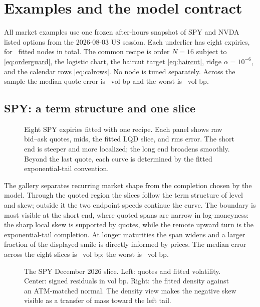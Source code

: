 \section{Examples and the model contract}
\label{sec:examples}

All market examples use one frozen after-hours snapshot of SPY and NVDA listed
options from the 2026-08-03 US session.  Each underlier has eight expiries,
for \MacSnapNodeCount\ fitted nodes in total.  The common recipe is order
$N=16$ subject to \eqref{eq:orderguard}, the logistic chart, the haircut
target \eqref{eq:haircut}, ridge $\alpha=10^{-6}$, and the calendar rows
\eqref{eq:calrows}.  No node is tuned separately.  Across the sample the
median quote error is \MacSnapMedianRmsBp\ vol bp and the worst is
\MacSnapWorstRmsBp\ vol bp.

\subsection{SPY: a term structure and one slice}

\begin{figure}[htbp]
\centering
{}
\caption{Eight SPY expiries fitted with one recipe.  Each panel shows raw
bid--ask quotes, mids, the fitted LQD slice, and rms error.  The short end is
steeper and more localized; the long end broadens smoothly.  Beyond the last
quote, each curve is determined by the fitted exponential-tail convention.}
\label{fig:spy_gallery}
\end{figure}

The gallery separates recurring market shape from the completion chosen by
the model.  Through the quoted region the slices follow the term structure of
level and skew; outside it the two endpoint speeds continue the curve.  The
boundary is most visible at the short end, where quoted spans are narrow in
log-moneyness: the sharp local skew is supported by quotes, while the remote
upward turn is the exponential-tail completion.  At longer maturities the
span widens and a larger fraction of the displayed smile is directly
informed by prices.  The median error across the eight slices is
\MacSpyGalleryMedianRmsBp\ vol bp; the worst is
\MacSpyGalleryWorstRmsBp\ vol bp.

\begin{figure}[htbp]
\centering
{}
\caption{The SPY December 2026 slice.  Left: quotes and fitted volatility.
Center: signed residuals in vol bp.  Right: the fitted density against an
ATM-matched normal.  The density view makes the negative skew visible as a
transfer of mass toward the left tail.}
\label{fig:spy_node}
\end{figure}

